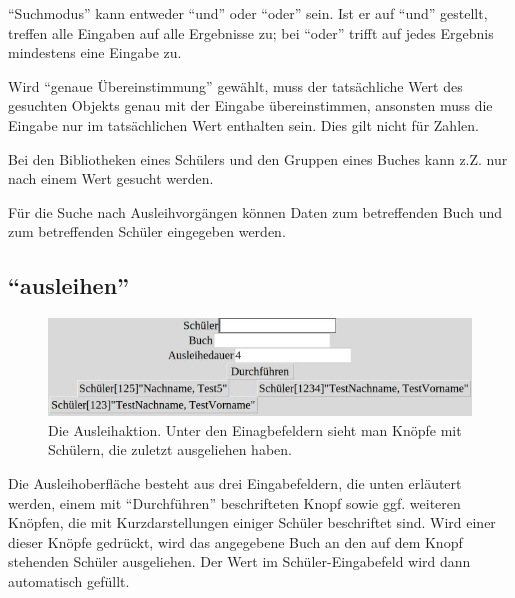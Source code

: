 ``Suchmodus'' kann entweder ``und'' oder ``oder'' sein. Ist er auf ``und'' gestellt, treffen alle Eingaben auf alle Ergebnisse zu; bei ``oder'' trifft auf jedes Ergebnis mindestens eine Eingabe zu.

Wird ``genaue Übereinstimmung'' gewählt, muss der tatsächliche Wert des gesuchten Objekts genau mit der Eingabe übereinstimmen, ansonsten muss die Eingabe nur im tatsächlichen Wert enthalten sein. Dies gilt nicht für Zahlen.

Bei den Bibliotheken eines Schülers und den Gruppen eines Buches kann z.Z. nur nach einem Wert gesucht werden.

Für die Suche nach Ausleihvorgängen können Daten zum betreffenden Buch und zum betreffenden Schüler eingegeben werden.


\subsection{``ausleihen''}
\label{subsec:detail:borrow}
\begin{figure}\includegraphics{images/gui2/borrow_with_people.jpg}\caption{Die Ausleihaktion. Unter den Einagbefeldern sieht man Knöpfe mit Schülern, die zuletzt ausgeliehen haben.}\label{fig:borrow_with_people}\end{figure}

Die Ausleihoberfläche besteht aus drei Eingabefeldern, die unten erläutert werden, einem mit ``Durchführen'' beschrifteten Knopf sowie ggf. weiteren Knöpfen, die mit Kurzdarstellungen einiger Schüler beschriftet sind.
Wird einer dieser Knöpfe gedrückt, wird das angegebene Buch an den auf dem Knopf stehenden Schüler ausgeliehen. Der Wert im Schüler-Eingabefeld wird dann automatisch gefüllt.

